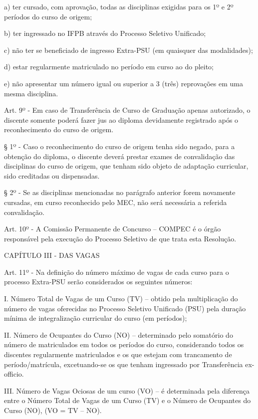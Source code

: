 	a) ter cursado, com aprovação, todas as disciplinas exigidas para os 1º e 2º períodos do curso de origem;

	b) ter ingressado no IFPB através do Processo Seletivo Unificado;

	c) não ter se beneficiado de ingresso Extra-PSU (em quaisquer das modalidades);

	d) estar regularmente matriculado no período em curso ao do pleito;

	e) não apresentar um número igual ou superior a 3 (três) reprovações em uma mesma disciplina.

\vspace{1mm}
Art. 9º - Em caso de Transferência de Curso de Graduação apenas autorizado, o discente somente poderá fazer jus ao diploma devidamente registrado após o reconhecimento do curso de origem.

§ 1º - Caso o reconhecimento do curso de origem tenha sido negado, para a obtenção do diploma, o discente deverá prestar exames de convalidação das disciplinas do curso de origem, que tenham sido objeto de adaptação curricular, sido creditadas ou dispensadas.

§ 2º - Se as disciplinas mencionadas no parágrafo anterior forem novamente cursadas, em curso reconhecido pelo MEC, não será necessária a referida convalidação.

\vspace{1mm}
Art. 10º - A Comissão Permanente de Concurso – COMPEC é o órgão responsável pela execução do Processo Seletivo de que trata esta Resolução.


CAPÍTULO III - DAS VAGAS


\vspace{1mm}
Art. 11º - Na definição do número máximo de vagas de cada curso para o processo Extra-PSU serão considerados os seguintes números:


I. Número Total de Vagas de um Curso (TV) – obtido pela multiplicação do número de vagas oferecidas no Processo Seletivo Unificado (PSU) pela duração mínima de integralização curricular do curso (em períodos);

II. Número de Ocupantes do Curso (NO) – determinado pelo somatório do número de matriculados em todos os períodos do curso, considerando todos os discentes regularmente matriculados e os que estejam com trancamento de período/matrícula, excetuando-se os que tenham ingressado por Transferência ex-officio.

III. Número de Vagas Ociosas de um curso (VO) – é determinada pela diferença entre o Número Total de Vagas de um Curso (TV) e o Número de Ocupantes do Curso (NO), (VO = TV – NO).


